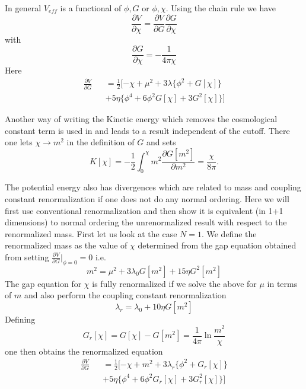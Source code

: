 \documentclass[a4paper,prd,preprint,superscriptaddress,showpacs,byrevtex]{revtex4}
\begin{document}
In general $V_{eff}$ is a functional of $\phi, G$ or $\phi, \chi$. Using the
chain rule we have
\begin{equation}
\frac{\partial V} {\partial \chi} = \frac{\partial V} {\partial
G}\frac{\partial G} {\partial \chi}
\end{equation}
with
\begin{equation}
\frac{\partial G} {\partial \chi} = - \frac {1} {4 \pi \chi}
\end{equation}
 Here
\begin{eqnarray}
\frac {\partial V} {\partial G}&& = \frac{1}{2}[ -\chi + \mu^2 + 3 \lambda
\{ \phi^2 + G[\chi] \} \nonumber \\
&&+ 5 \eta \{ \phi^4 +6  \phi^2 G [\chi] + 3 G^2[\chi]\} ]  \label{gap1a}
\end{eqnarray}

Another way of writing the Kinetic energy which removes the cosmological
constant
term is used in \cite{ref:BMB} and leads to a result independent of the
cutoff.
There one lets  $\chi \rightarrow m^2$ in the definition of $G$  and sets
  \begin{equation}
K[\chi] = -\frac{1}{2} \int_0^\chi m^2  \frac {\partial G[m^2]}{\partial
m^2}
= \frac {\chi}{8 \pi}.
 \end{equation}

The potential energy also has divergences which are related to mass and
coupling constant renormalization if one does not do any normal ordering.
Here
we will first use conventional renormalization and then show it is
equivalent
(in 1+1 dimensions) to normal ordering the unrenormalized result with
respect
to the renormalized mass.   First let us look at the case $N=1$.
We define the renormalized mass  as the value of $\chi$
determined from the gap equation obtained from setting  $\frac {\partial V}
{\partial G}|_{\phi=0} =0 $  i.e.  \begin{equation}
m^2  = \mu^2 + 3 \lambda_0 G[m^2]+ 15 \eta G^2 [m^2]
\end{equation}
The gap equation for $\chi$ is fully renormalized if we solve the above for
$\mu$ in terms of $m$ and also perform the coupling constant renormalization
\begin{equation}
\lambda_r= \lambda_0 + 10 \eta G[m^2]
\end{equation}
Defining
\begin{equation}
G_r[\chi] = G[\chi]-G[m^2] = \frac{1}{4 \pi} \ln \frac{m^2}{\chi}
\end{equation}
one then obtains the renormalized equation
\begin{eqnarray}
\frac {\partial V} {\partial G}&& = \frac{1}{2}[ -\chi + m^2 + 3 \lambda_r
\{ \phi^2 + G_r[\chi] \} \nonumber \\
&&+ 5 \eta \{ \phi^4 +6  \phi^2 G_r [\chi] + 3 G_r^2[\chi]\} ]  \label{gap2}
\end{eqnarray}
\end{document}
